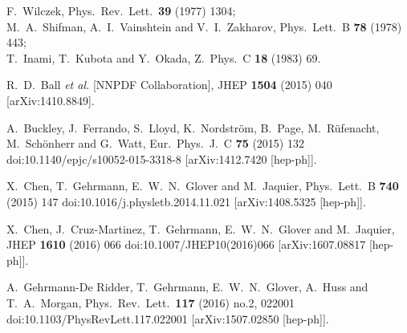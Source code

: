 \documentclass[12pt]{article}
\begin{document}
\begin{thebibliography}{99}
  F.~Wilczek,
  Phys.\ Rev.\ Lett.\  {\bf 39} (1977) 1304;\\
 M.~A.~Shifman, A.~I.~Vainshtein and V.~I.~Zakharov,
  Phys.\ Lett.\ B {\bf 78} (1978) 443;\\
  T.~Inami, T.~Kubota and Y.~Okada,
  Z.\ Phys.\ C {\bf 18} (1983) 69.

  
   R.~D.~Ball {\it et al.} [NNPDF Collaboration],
  JHEP {\bf 1504} (2015) 040
  [arXiv:1410.8849].

  A.~Buckley, J.~Ferrando, S.~Lloyd, K.~Nordström, B.~Page, M.~Rüfenacht, M.~Schönherr and G.~Watt,
  Eur.\ Phys.\ J.\ C {\bf 75} (2015) 132
  doi:10.1140/epjc/s10052-015-3318-8
  [arXiv:1412.7420 [hep-ph]].

  
  X.~Chen, T.~Gehrmann, E.~W.~N.~Glover and M.~Jaquier,
  Phys.\ Lett.\ B {\bf 740} (2015) 147
  doi:10.1016/j.physletb.2014.11.021
  [arXiv:1408.5325 [hep-ph]].
  
  X.~Chen, J.~Cruz-Martinez, T.~Gehrmann, E.~W.~N.~Glover and M.~Jaquier,
  JHEP {\bf 1610} (2016) 066
  doi:10.1007/JHEP10(2016)066
  [arXiv:1607.08817 [hep-ph]].

  A.~Gehrmann-De Ridder, T.~Gehrmann, E.~W.~N.~Glover, A.~Huss and T.~A.~Morgan,
  Phys.\ Rev.\ Lett.\  {\bf 117} (2016) no.2,  022001
  doi:10.1103/PhysRevLett.117.022001
  [arXiv:1507.02850 [hep-ph]].


\end{thebibliography}
\end{document}
